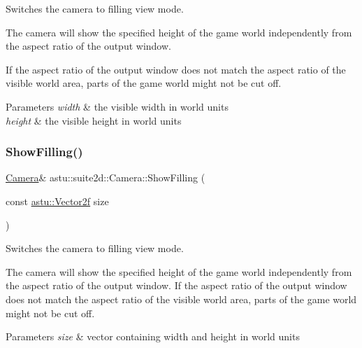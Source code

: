 Switches the camera to filling view mode.

The camera will show the specified height of the game world independently from the aspect ratio of the output window.

If the aspect ratio of the output window does not match the aspect ratio of the visible world area, parts of the game world might not be cut off.


\begin{DoxyParams}{Parameters}
{\em width} & the visible width in world units \\
\hline
{\em height} & the visible height in world units \\
\hline
\end{DoxyParams}
\mbox{\label{classastu_1_1suite2d_1_1Camera_acf376d632203455b7b9f5ce91b7704fe}} 
\subsubsection{\texorpdfstring{Show\+Filling()}{ShowFilling()}\hspace{0.1cm}{\footnotesize\ttfamily [2/2]}}
{\footnotesize\ttfamily \hyperlink{classastu_1_1suite2d_1_1Camera}{Camera}\& astu\+::suite2d\+::\+Camera\+::\+Show\+Filling (\begin{DoxyParamCaption}\item[{const \hyperlink{classastu_1_1Vector2}{astu\+::\+Vector2f}}]{size }\end{DoxyParamCaption})\hspace{0.3cm}{\ttfamily [inline]}}

Switches the camera to filling view mode.

The camera will show the specified height of the game world independently from the aspect ratio of the output window. If the aspect ratio of the output window does not match the aspect ratio of the visible world area, parts of the game world might not be cut off.


\begin{DoxyParams}{Parameters}
{\em size} & vector containing width and height in world units \\
\hline
\end{DoxyParams}
\mbox{\label{classastu_1_1suite2d_1_1Camera_a5c6c40c17d8c21961888541c7aef6baf}} 
